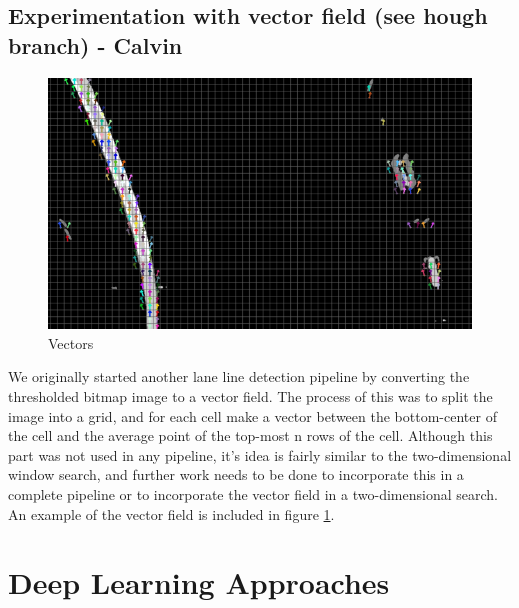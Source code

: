 \documentclass[twoside,twocolumn]{article}
\begin{document}
\subsection{Experimentation with vector field (see hough branch) - Calvin}
\begin{figure}
  \includegraphics[width=\linewidth]{calvin5.png}
  \caption{Vectors}
  \label{fig:vectors}
\end{figure}

\par We originally started another lane line detection pipeline by converting the thresholded bitmap image to a vector field. The process of this was to split the image into a grid, and for each cell make a vector between the bottom-center of the cell and the average point of the top-most n rows of the cell. Although this part was not used in any pipeline, it's idea is fairly similar to the two-dimensional window search, and further work needs to be done to incorporate this in a complete pipeline or to incorporate the vector field in a two-dimensional search. An example of the vector field is included in figure \ref{fig:vectors}.



\section{Deep Learning Approaches}
\end{document}
